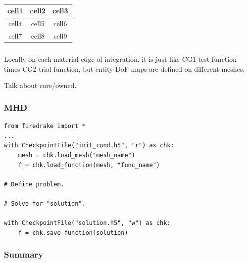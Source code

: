 \documentclass[]{beamer}
\begin{document}
\begin{frame}
\frametitle{}
\begin{center}
\begin{tabular}{ |c|c|c| } 
 \hline
 cell1 & cell2 & cell3 \\ 
 \hline
 cell4 & cell5 & cell6 \\ 
 \hline
 cell7 & cell8 & cell9 \\ 
 \hline
\end{tabular}
\end{center}

\end{frame}
\begin{frame}
\frametitle{}

Locally on each material edge of integration,
it is just like CG1 test function times CG2 trial function, but
entity-DoF maps are defined on different meshes.

Talk about core/owned.

\end{frame}
\begin{frame}[fragile]
\frametitle{MHD}
\begin{verbatim}
from firedrake import *
...
with CheckpointFile("init_cond.h5", "r") as chk:
    mesh = chk.load_mesh("mesh_name")
    f = chk.load_function(mesh, "func_name")

# Define problem.

# Solve for "solution".

with CheckpointFile("solution.h5", "w") as chk:
    f = chk.save_function(solution)
\end{verbatim}
\end{frame}
\begin{frame}
\frametitle{Summary}
\end{frame}
\end{document}
